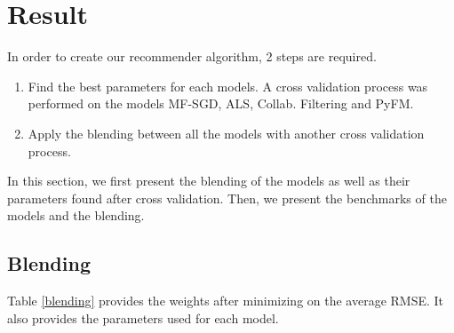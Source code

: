 \documentclass[10pt,conference,compsocconf]{IEEEtran}
\begin{document}
\section{Result}

In order to create our recommender algorithm, 2 steps are required. 
\begin{enumerate}
\item Find the best parameters for each models. A cross validation process was performed on the models MF-SGD, ALS, Collab. Filtering and PyFM. %
\item Apply the blending between all the models with another cross validation process.%
\end{enumerate}
In this section, we first present the blending of the models as well as their parameters found after cross validation. Then, we present the benchmarks of the models and the blending.

\subsection{Blending}

Table \ref{blending} provides the weights after minimizing on the average RMSE. It also provides the parameters used for each model.
\end{document}
